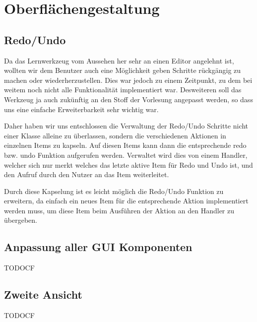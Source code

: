 

\chapter{Oberflächengestaltung}\label{GUI}


\section{Redo/Undo}

Da das Lernwerkzeug vom Aussehen her sehr an einen Editor angelehnt ist,
wollten wir dem Benutzer auch eine Möglichkeit geben Schritte rückgängig zu
machen oder wiederherzustellen. Dies war jedoch zu einem Zeitpunkt, zu dem bei
weitem noch nicht alle Funktionalität implementiert war. Desweiteren soll das
Werkzeug ja auch zukünftig an den Stoff der Vorlesung angepasst werden, so dass
uns eine einfache Erweiterbarkeit sehr wichtig war.\vspace{10pt}

Daher haben wir uns entschlossen die Verwaltung der Redo/Undo Schritte nicht
einer Klasse alleine zu überlassen, sondern die verschiedenen Aktionen in
einzelnen Items zu kapseln. Auf diesen Items kann dann die entsprechende redo
bzw. undo Funktion aufgerufen werden. Verwaltet wird dies von einem Handler,
welcher sich nur merkt welches das letzte aktive Item für Redo und Undo ist,
und den Aufruf durch den Nutzer an das Item weiterleitet.\vspace{10pt}

Durch diese Kapselung ist es leicht möglich die Redo/Undo Funktion zu
erweitern, da einfach ein neues Item für die entsprechende Aktion implementiert
werden muss, um diese Item beim Ausführen der Aktion an den Handler zu
übergeben.


\section{Anpassung aller GUI Komponenten}

TODOCF


\section{Zweite Ansicht}

TODOCF